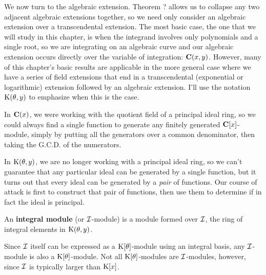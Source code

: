 
\setcounter{chapter}{8}

We now turn to the algebraic extension.  Theorem ? allows us to
collapse any two adjacent algebraic extensions together, so we need
only consider an algebraic extension over a transcendental extension.
The most basic case, the one that we will study in this chapter, is
when the integrand involves only polynomials and a single root, so we
are integrating on an algebraic curve and our algebraic extension
occurs directly over the variable of integration: ${\bf C}(x,y)$.
However, many of this chapter's basic results are applicable in the
more general case where we have a series of field extensions that end
in a transcendental (exponential or logarithmic) extension followed by
an algebraic extension.  I'll use the notation ${\rm K}(\theta, y)$ to
emphasize when this is the case.



{}

In ${\bf C}(x)$, we were working with the quotient field of a
principal ideal ring, so we could always find a single function to
generate any finitely generated ${\bf C}[x]$-module, simply by putting
all the generators over a common denominator, then taking the
G.C.D. of the numerators.

In ${\rm K}(\theta,y)$, we are no longer working with a principal ideal
ring, so we can't guarantee that any particular ideal can be generated
by a single function, but it turns out that every ideal can be
generated by a {\it pair} of functions.  Our course of attack is first
to construct that pair of functions, then use them to determine if in
fact the ideal is principal.


An {\bf integral module} (or ${\cal I}$-module) is a module formed
over ${\cal I}$, the ring of integral elements in ${\rm K}(\theta,y)$.

\enddefinition

Since ${\cal I}$ itself can be expressed as a ${\rm K}[\theta]$-module
using an integral basis, any ${\cal I}$-module is also a ${\rm
K}[\theta]$-module.  Not all ${\rm K}[\theta]$-modules are ${\cal
I}$-modules, however, since ${\cal I}$ is typically larger than ${\rm
K}[x]$.


